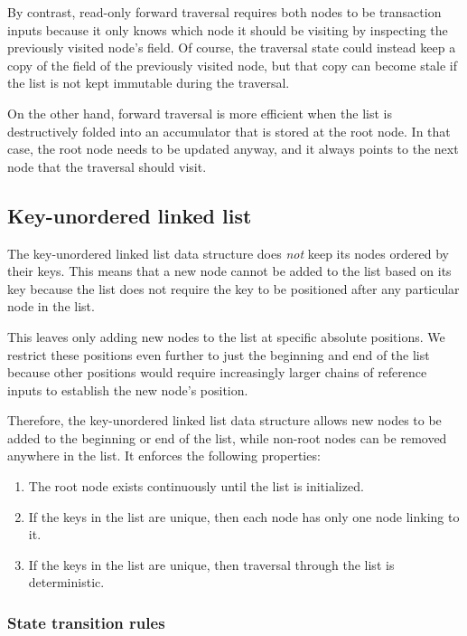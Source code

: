 \documentclass[../midgard.tex]{subfiles}
\begin{document}
By contrast, read-only forward traversal requires both nodes to be transaction inputs because it only knows which node it should be visiting by inspecting the previously visited node's  field.
Of course, the traversal state could instead keep a copy of the  field of the previously visited node, but that copy can become stale if the list is not kept immutable during the traversal.

On the other hand, forward traversal is more efficient when the list is destructively folded into an accumulator that is stored at the root node.
In that case, the root node needs to be updated anyway, and it always points to the next node that the traversal should visit.

\subsection{Key-unordered linked list}
\label{h:key-unordered-list}

The key-unordered linked list data structure does \emph{not} keep its nodes ordered by their keys.
This means that a new node cannot be added to the list based on its key because the list does not require the key to be positioned after any particular node in the list.

This leaves only adding new nodes to the list at specific absolute positions.
We restrict these positions even further to just the beginning and end of the list because other positions would require increasingly larger chains of reference inputs to establish the new node's position.

Therefore, the key-unordered linked list data structure allows new nodes to be added to the beginning or end of the list, while non-root nodes can be removed anywhere in the list.
It enforces the following properties:
\begin{enumerate}
    \item The root node exists continuously until the list is initialized.
    \item If the keys in the list are unique, then each node has only one node linking to it.
    \item If the keys in the list are unique, then traversal through the list is deterministic.
\end{enumerate}

\subsubsection{State transition rules}
\label{h:key-unordered-list-state-transition-rules}
\end{document}

